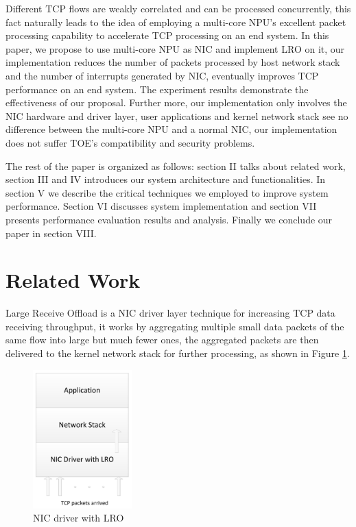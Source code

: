\documentclass[conference]{IEEEtran}
\begin{document}
Different TCP flows are weakly correlated and can be processed concurrently, this fact naturally leads to the idea of employing a multi-core NPU's excellent packet processing capability to accelerate TCP processing on an end system. In this paper, we propose to use multi-core NPU as NIC and implement LRO on it, our implementation reduces the number of packets processed by host network stack and the number of interrupts generated by NIC, eventually improves TCP performance on an end system. The experiment results demonstrate the effectiveness of our proposal. Further more, our implementation only involves the NIC hardware and driver layer, user applications and kernel network stack see no difference between the multi-core NPU and a normal NIC, our implementation does not suffer TOE's compatibility and security problems.

The rest of the paper is organized as follows: section II talks about related work, section III and IV introduces our system architecture and functionalities. In section V we describe the critical techniques we employed to improve system performance. Section VI discusses system implementation and section VII presents performance evaluation results and analysis. Finally we conclude our paper in section VIII.
\section{Related Work}
Large Receive Offload is a NIC driver layer technique for increasing TCP data receiving throughput, it works by aggregating multiple small data packets of the same flow into large but much fewer ones, the aggregated packets are then delivered to the kernel network stack for further processing, as shown in Figure \ref{driver_with_lro}.
\begin{figure}[!t]
\centering
\includegraphics[width=1.5in]{nic_driver_with_lro}
\caption{NIC driver with LRO}
\label{driver_with_lro}
\end{figure}
\end{document}
